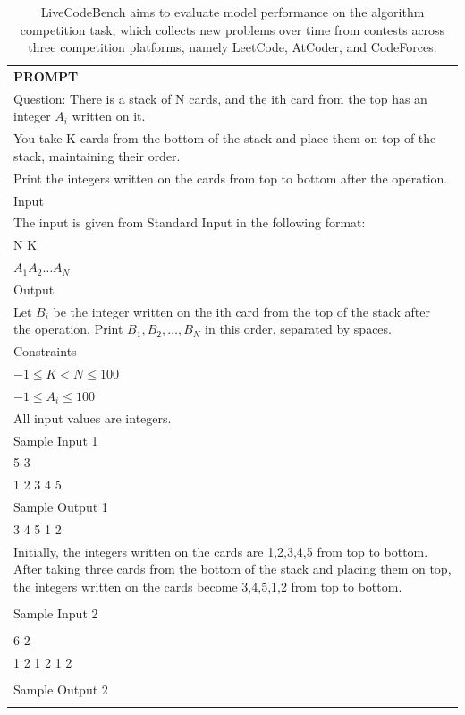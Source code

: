 \begin{table}[h]
    \centering \small
        \caption{LiveCodeBench aims to evaluate model performance on the algorithm competition task, which collects new problems over time from contests across three competition platforms, namely LeetCode, AtCoder, and CodeForces. }
    \label{tab:lcb_eval_format_example}
    \begin{tabular}{p{}}
    \hline
    \textbf{PROMPT}\\
Question:
There is a stack of N cards, and the i\-th card from the top has an integer $A_i$ written on it. \\
You take K cards from the bottom of the stack and place them on top of the stack, maintaining their order. \\
Print the integers written on the cards from top to bottom after the operation. \\
Input\\
The input is given from Standard Input in the following format:\\
N K\\
$A_1 A_2 \ldots A_N$\\
Output\\
Let $B_i$ be the integer written on the i\-th card from the top of the stack after the operation. Print $B_1,B_2,\ldots,B_N$ in this order, separated by spaces.\\
Constraints\\
$-1 \leq K < N \leq 100$\\
$-1 \leq A_i \leq 100$\\
All input values are integers.\\
Sample Input 1\\
5 3 \\
1 2 3 4 5 \\
Sample Output 1 \\
3 4 5 1 2\\
Initially, the integers written on the cards are 1,2,3,4,5 from top to bottom.
After taking three cards from the bottom of the stack and placing them on top, the integers written on the cards become 3,4,5,1,2 from top to bottom.\\
\\
Sample Input 2\\
\\
6 2\\
1 2 1 2 1 2\\
\\
Sample Output 2\\
\\

\end{tabular}
\end{table}
